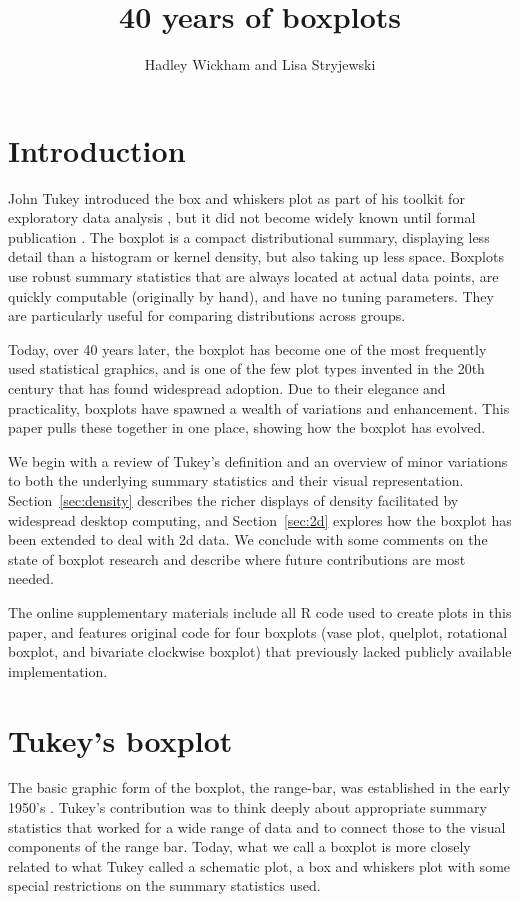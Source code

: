 \documentclass[oneside]{article}
\title{40 years of boxplots}
\author{Hadley Wickham and Lisa Stryjewski}
\begin{document}
\maketitle 

\section{Introduction}

John Tukey introduced the box and whiskers plot as part of his toolkit for exploratory data analysis \citep{tukey:1970}, but it did not become widely known until formal publication \citep{tukey:1977}. The boxplot is a compact distributional summary, displaying less detail than a histogram or kernel density, but also taking up less space. Boxplots use robust summary statistics that are always located at actual data points, are quickly computable (originally by hand), and have no tuning parameters. They are particularly useful for comparing distributions across groups.

Today, over 40 years later, the boxplot has become one of the most frequently used statistical graphics, and is one of the few plot types invented in the 20th century that has found widespread adoption. Due to their elegance and practicality, boxplots have spawned a wealth of variations and enhancement. This paper pulls these together in one place, showing how the boxplot has evolved.

We begin with a review of Tukey's definition and an overview of minor variations to both the underlying summary statistics and their visual representation. Section~\ref{sec:density} describes the richer displays of density facilitated by widespread desktop computing, and Section~\ref{sec:2d} explores how the boxplot has been extended to deal with 2d data. We conclude with some comments on the state of boxplot research and describe where future contributions are most needed.

The online supplementary materials include all R code \citep{R} used to create plots in this paper, and features original code for four boxplots (vase plot, quelplot, rotational boxplot, and bivariate clockwise boxplot) that previously lacked publicly available implementation.

\section{Tukey's boxplot}
\label{sec:tukey}

The basic graphic form of the boxplot, the range-bar, was established in the early 1950's \citet[pg. 164]{spear:1952}. Tukey's contribution was to think deeply about appropriate summary statistics that worked for a wide range of data and to connect those to the visual components of the range bar. Today, what we call a boxplot is more closely related to what Tukey called a schematic plot, a box and whiskers plot with some special restrictions on the summary statistics used. %
\end{document}
